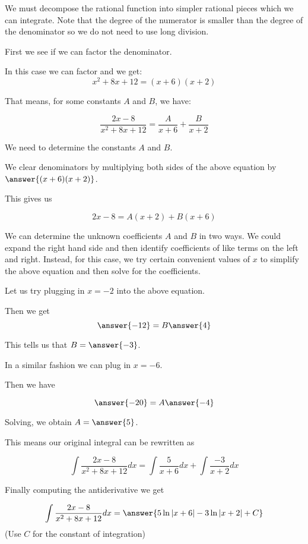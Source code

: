 \documentclass{ximera}
\begin{document}
\begin{exercise}
\begin{exercise}
\begin{exercise}
\begin{exercise}
\begin{exercise}
\begin{exercise}
We must decompose the rational function into simpler rational pieces which we can integrate. 
Note that the degree of the numerator is smaller than the degree of the denominator so we do not need 
to use long division. 

First we see if we can factor the denominator. 

In this case we can factor and we get:
\[
x^{2}+8x+12=(x+6)(x+2)
\]

That means, for some constants $A$ and $B$, we have:

\[
\frac{2x-8}{x^{2}+8x+12}= \frac{A}{x+6} + \frac{B}{x+2}
\]

We need to determine the constants $A$ and $B$. 

We clear denominators by multiplying both sides of the above equation by $\answer{(x+6)(x+2)}$. 

This gives us 

\[
2x-8=A(x+2) + B(x+6)
\]

We can determine the unknown coefficients $A$ and $B$ in two ways. 
We could expand the right hand side and then identify coefficients of like terms on the left and right.
Instead, for this case, we try certain convenient values of $x$ to simplify the above equation and then solve for the coefficients. 

Let us try plugging in $x=-2$ into the above equation. 

Then we get 
\[
\answer{-12 }= B\answer{4}
\]

This tells us that $B=\answer{ -3}$. 


In a similar fashion we can plug in $x=-6$. 

Then we have 

\[
\answer{-20}=A\answer{-4}
\]

Solving, we obtain $A=\answer{5}$. 

\begin{exercise}
This means our original integral can be rewritten as 

\[
\int \frac{2x-8}{x^{2}+8x+12} dx= \int \frac{5}{x+6} dx + \int \frac{-3}{x+2} dx
\]

 Finally computing the antiderivative we get 

\[
\int \frac{2x-8}{x^{2}+8x+12} dx= \answer{ 5\ln|x+6|-3\ln|x+2| + C }
\]
(Use $C$ for the constant of integration)

\end{exercise}
\end{exercise}
\end{exercise}
\end{exercise}
\end{exercise}
\end{exercise}


\end{exercise}
\end{document}
